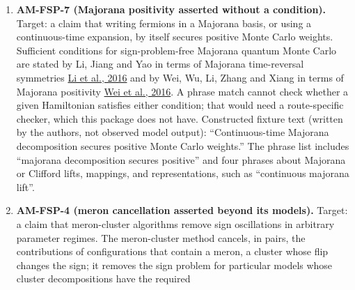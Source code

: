 \documentclass[
  11pt,
]{article}
\begin{document}
\begin{enumerate}
  The diagonal sign-gauge question is separate again. Non-bipartiteness
  alone does not obstruct a diagonal sign gauge. For example, the
  \(3 \times 3\) Hamiltonian
  \[H = \begin{pmatrix}0 & 1 & -1 \\ 1 & 0 & 1 \\ -1 & 1 & 0\end{pmatrix}\]
  has a triangle as its underlying graph, yet the diagonal sign gauge
  \(S = \operatorname{diag}(1, -1, 1)\) makes every off-diagonal entry
  non-positive:
  \[SHS = \begin{pmatrix}0 & -1 & -1 \\ -1 & 0 & -1 \\ -1 & -1 & 0\end{pmatrix}.\]
  Obstruction to a diagonal sign gauge requires a frustrated signed
  cycle, one whose gauge-invariant sign product
  \(\prod_{(i,j) \in C} \operatorname{sgn}(-H_{ij})\) equals \(-1\),
  rather than odd-cycle topology alone.
\item
  \textbf{AM-FSP-7 (Majorana positivity asserted without a condition).}
  Target: a claim that writing fermions in a Majorana basis, or using a
  continuous-time expansion, by itself secures positive Monte Carlo
  weights. Sufficient conditions for sign-problem-free Majorana quantum
  Monte Carlo are stated by Li, Jiang and Yao in terms of Majorana
  time-reversal symmetries
  \href{https://doi.org/10.1103/PhysRevLett.117.267002}{Li et al., 2016}
  and by Wei, Wu, Li, Zhang and Xiang in terms of Majorana positivity
  \href{https://doi.org/10.1103/PhysRevLett.116.250601}{Wei et al.,
  2016}. A phrase match cannot check whether a given Hamiltonian
  satisfies either condition; that would need a route-specific checker,
  which this package does not have. Constructed fixture text (written by
  the authors, not observed model output): ``Continuous-time Majorana
  decomposition secures positive Monte Carlo weights.'' The phrase list
  includes ``majorana decomposition secures positive'' and four phrases
  about Majorana or Clifford lifts, mappings, and representations, such
  as ``continuous majorana lift''.
\item
  \textbf{AM-FSP-4 (meron cancellation asserted beyond its models).}
  Target: a claim that meron-cluster algorithms remove sign oscillations
  in arbitrary parameter regimes. The meron-cluster method cancels, in
  pairs, the contributions of configurations that contain a meron, a
  cluster whose flip changes the sign; it removes the sign problem for
  particular models whose cluster decompositions have the required

\end{enumerate}
\end{document}
